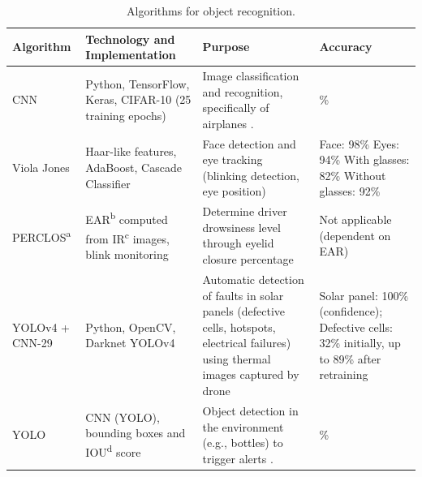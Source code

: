                 \begin{table}[!htbp]
                    \caption{Algorithms for object recognition.}
                    \label{tab:object-recognition}
                    \centering
                    \begin{tabular}{
                            >{\raggedright\arraybackslash}p{}
                            >{\raggedright\arraybackslash}p{}
                            >{\raggedright\arraybackslash}p{}
                            >{\raggedright\arraybackslash}p{}
                        }
                        \toprule
                        \textbf{Algorithm} & \textbf{Technology and Implementation} & \textbf{Purpose} & \textbf{Accuracy} \\
                        \midrule
                        
                        CNN & Python, TensorFlow, Keras, CIFAR-10 (25 training epochs) & Image classification and recognition, specifically of airplanes \citep{Sudharshan2018Object}. & 96.00\% \\
                        
                        Viola Jones & Haar-like features, AdaBoost, Cascade Classifier & Face detection and eye tracking (blinking detection, eye position) \citep{Teja2021Real} & 
                        Face: 98\%
                        Eyes: 94\%
                        With glasses: 82\%
                        Without glasses: 92\%\\
                        
                        PERCLOS\textsuperscript{a} & EAR\textsuperscript{b} computed from IR\textsuperscript{c} images, blink monitoring & Determine driver drowsiness level through eyelid closure percentage \citep{Teja2021Real} & Not applicable (dependent on EAR) \\
                        
                        YOLOv4 + CNN-29 & Python, OpenCV, Darknet YOLOv4 & Automatic detection of faults in solar panels (defective cells, hotspots, electrical failures) using thermal images captured by drone \citep{Zou2022Drone} & Solar panel: 100\% (confidence);
                        Defective cells: 32\% initially, up to 89\% after retraining \\
                        
                        YOLO & CNN (YOLO), bounding boxes and IOU\textsuperscript{d} score & Object detection in the environment (e.g., bottles) to trigger alerts \citep{Teja2021Real}. & 98.00\% \\
                        

\end{tabular}
\end{table}
